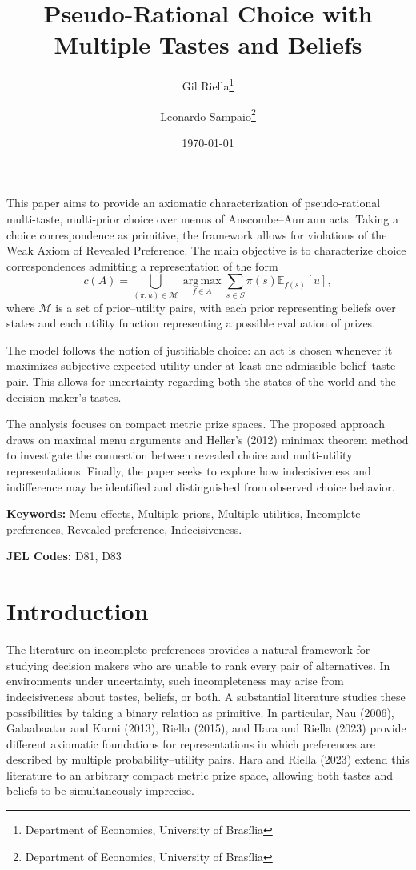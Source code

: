 \documentclass[11pt]{article}
\renewenvironment{abstract}
  {\small\begin{center}\bfseries\abstractname\end{center}\noindent}
  {\par}
\begin{document}
\title{Pseudo-Rational Choice with Multiple Tastes and Beliefs}
\author{Gil Riella\thanks{Department of Economics, University of Brasília} \and Leonardo Sampaio\thanks{Department of Economics, University of Brasília}}
\date{\today}
\maketitle
\begin{abstract}
This paper aims to provide an axiomatic characterization of pseudo-rational
multi-taste, multi-prior choice over menus of Anscombe--Aumann acts. Taking a
choice correspondence as primitive, the framework allows for violations of
the Weak Axiom of Revealed Preference. The main objective is to characterize
choice correspondences admitting a representation of the form
\[
    c(A)=\bigcup_{(\pi,u)\in\mathcal{M}}
    \operatorname*{arg\,max}_{f\in A}
    \sum_{s\in S}\pi(s)\mathbb{E}_{f(s)}[u],
\]
where $\mathcal{M}$ is a set of prior--utility pairs, with each prior
representing beliefs over states and each utility function representing a
possible evaluation of prizes.

The model follows the notion of justifiable choice: an act is chosen whenever
it maximizes subjective expected utility under at least one admissible belief--taste
pair. This allows for uncertainty regarding both the states of the world and
the decision maker's tastes.

The analysis focuses on compact metric prize spaces. The proposed approach draws on
maximal menu arguments and Heller's (2012) minimax theorem method to
investigate the connection between revealed choice and multi-utility
representations. Finally, the paper seeks to explore how indecisiveness and
indifference may be identified and distinguished from observed choice
behavior.

\medskip
\noindent\textbf{Keywords:} Menu effects, Multiple priors, Multiple utilities, Incomplete preferences, Revealed preference, Indecisiveness.

\medskip
\noindent\textbf{JEL Codes:} D81, D83
\end{abstract}

\newpage

\section{Introduction} \label{sec:introduction}

The literature on incomplete preferences provides a natural framework for studying decision makers who are unable to rank every pair of alternatives. In environments under uncertainty, such incompleteness may arise from indecisiveness about tastes, beliefs, or both. A substantial literature studies these possibilities by taking a binary relation as primitive. In particular, Nau (2006), Galaabaatar and Karni (2013), Riella (2015), and Hara and Riella (2023) provide different axiomatic foundations for representations in which preferences are described by multiple probability--utility pairs. Hara and Riella (2023) extend this literature to an arbitrary compact metric prize space, allowing both tastes and beliefs to be simultaneously imprecise.
\end{document}
